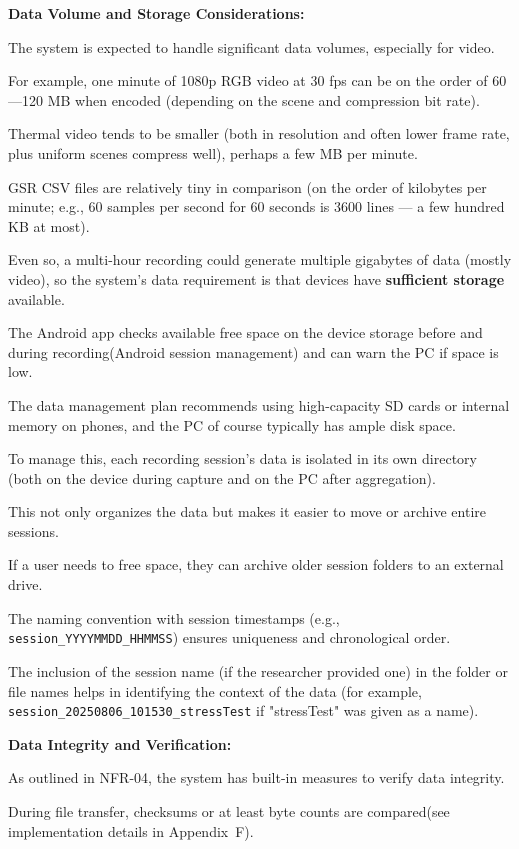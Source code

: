 \textbf{Data Volume and Storage Considerations:}

The system is expected to handle significant data volumes, especially for video.

For example, one minute of 1080p RGB video at 30 fps can be on the order of 60---120 MB when encoded (depending on the scene and compression bit rate).

Thermal video tends to be smaller (both in resolution and often lower frame rate, plus uniform scenes compress well), perhaps a few MB per minute.

GSR CSV files are relatively tiny in comparison (on the order of kilobytes per minute; e.g., 60 samples per second for 60 seconds is 3600 lines --- a few hundred KB at most).

Even so, a multi-hour recording could generate multiple gigabytes of data (mostly video), so the system's data requirement is that devices have \textbf{sufficient storage}
 available.

The Android app checks available free space on the device storage before and during recording(Android session management) and can warn the PC if space is low.

The data management plan recommends using high-capacity SD cards or internal memory on phones, and the PC of course typically has ample disk space.

To manage this, each recording session's data is isolated in its own directory (both on the device during capture and on the PC after aggregation).

This not only organizes the data but makes it easier to move or archive entire sessions.

If a user needs to free space, they can archive older session folders to an external drive.

The naming convention with session timestamps (e.g., \texttt{session_YYYYMMDD_HHMMSS}) ensures uniqueness and chronological order.

The inclusion of the session name (if the researcher provided one) in the folder or file names helps in identifying the context of the data (for example, \texttt{session_20250806_101530_stressTest} if "stressTest" was given as a name).

\textbf{Data Integrity and Verification:}

As outlined in NFR-04, the system has built-in measures to verify data integrity.

During file transfer, checksums or at least byte counts are compared(see implementation details in Appendix~F).

